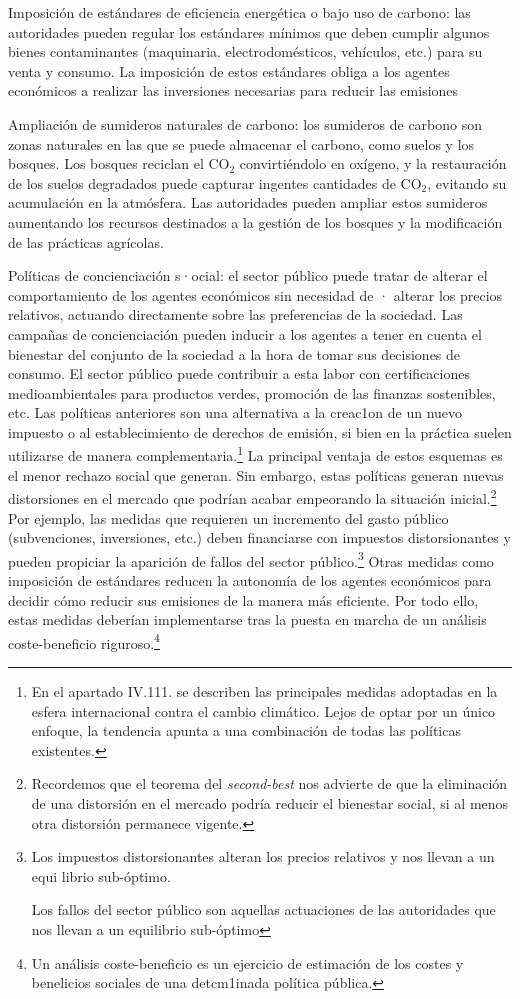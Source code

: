 \documentclass[10pt,a4paper]{article}
\begin{document}
Imposición de estándares de eficiencia energética o bajo uso de carbono: las autoridades pueden regular los estándares mínimos que deben cumplir algunos bienes contaminantes (maquinaria. electrodomésticos, vehículos, etc.) para su venta y consumo. La imposición de estos estándares obliga a los agentes económicos a realizar las inversiones necesarias para reducir las emisiones

Ampliación de sumideros naturales de carbono: los sumideros de carbono son zonas naturales en las que se puede almacenar el carbono, como suelos y los bosques. Los bosques reciclan el $\text{CO}_2$ convirtiéndolo en oxígeno, y la restauración de los suelos degradados puede capturar ingentes cantidades de $\text{CO}_2$, evitando su acumulación en la atmósfera. Las autoridades pueden ampliar estos sumideros aumentando los recursos destinados a la gestión de los bosques y la modificación de las prácticas agrícolas. 

Políticas de concienciación s·ocial: el sector público puede tratar de alterar el comportamiento de los agentes económicos sin necesidad de · alterar los precios relativos, actuando directamente sobre las preferencias de la sociedad. Las campañas de concienciación pueden inducir a los agentes a tener en cuenta el bienestar del conjunto de la sociedad a la hora de tomar sus decisiones de consumo. El sector público puede contribuir a esta labor con certificaciones medioambientales para productos verdes, promoción de las finanzas sostenibles, etc. Las políticas anteriores son una alternativa a la creac1on de un nuevo impuesto o al establecimiento de derechos de emisión, si bien en la práctica suelen utilizarse de manera complementaria.\footnote{%
    En el apartado IV.111. se describen las principales medidas adoptadas en la esfera internacional contra el cambio climático. Lejos de optar por un único enfoque, la tendencia apunta a una combinación de todas las políticas existentes.
} La principal ventaja de estos esquemas es el menor rechazo social que generan.  Sin embargo, estas políticas generan nuevas distorsiones en el mercado que podrían acabar empeorando la situación inicial.\footnote{%
    Recordemos que el teorema del \textit{second-best} nos advierte de que la eliminación de una distorsión en el mercado podría reducir el bienestar social, si al menos otra distorsión permanece vigente.
} Por ejemplo, las medidas que requieren un incremento del gasto público (subvenciones, inversiones, etc.) deben financiarse con impuestos distorsionantes y pueden propiciar la aparición de fallos del sector público.\footnote{%
    Los impuestos distorsionantes alteran los precios relativos y nos llevan a un equi librio sub-óptimo.

Los fallos del sector público son aquellas actuaciones de las autoridades que nos llevan a un equilibrio sub-óptimo
} Otras medidas como imposición de estándares reducen la autonomía de los agentes económicos para decidir cómo reducir sus emisiones de la manera más eficiente. Por todo ello, estas medidas deberían implementarse tras la puesta en marcha de un análisis coste-beneficio riguroso.\footnote{%
    Un análisis coste-beneficio es un ejercicio de estimación de los costes y benelicios sociales de una detcm1inada política pública.
}
\end{document}
